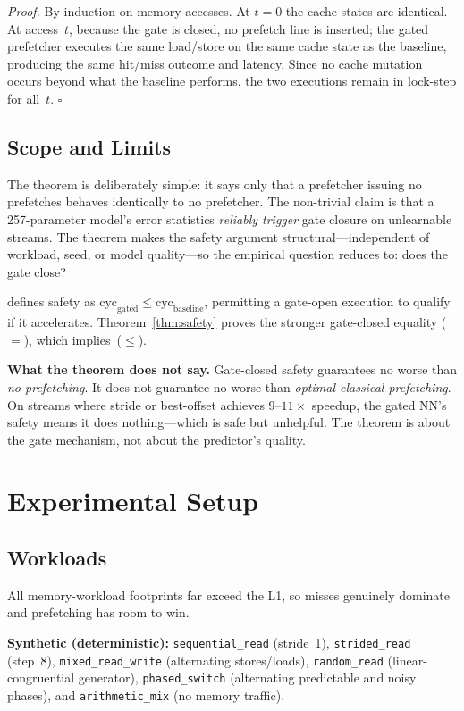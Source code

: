 \documentclass[conference]{IEEEtran}
\begin{document}
\noindent\textit{Proof.}
By induction on memory accesses. At $t{=}0$ the cache states are identical.
At access~$t$, because the gate is closed, no prefetch line is inserted; the
gated prefetcher executes the same load/store on the same cache state as the
baseline, producing the same hit/miss outcome and latency. Since no cache
mutation occurs beyond what the baseline performs, the two executions remain
in lock-step for all~$t$. \hfill$\square$

\subsection{Scope and Limits}
\label{sec:safety_limits}

The theorem is deliberately simple: it says only that a prefetcher issuing no
prefetches behaves identically to no prefetcher. The non-trivial claim is
that a 257-parameter model's error statistics \emph{reliably trigger} gate
closure on unlearnable streams. The theorem makes the safety argument
structural---independent of workload, seed, or model quality---so the
empirical question reduces to: does the gate close?

 defines safety as
$\text{cyc}_\text{gated} \leq \text{cyc}_\text{baseline}$, permitting a
gate-open execution to qualify if it accelerates.
Theorem~\ref{thm:safety} proves the stronger gate-closed equality ($=$),
which implies~($\leq$).

\textbf{What the theorem does not say.} Gate-closed safety guarantees no
worse than \emph{no prefetching}. It does not guarantee no worse than
\emph{optimal classical prefetching}. On streams where stride or best-offset
achieves $9$--$11\times$ speedup, the gated NN's safety means it does
nothing---which is safe but unhelpful. The theorem is about the gate
mechanism, not about the predictor's quality.

\section{Experimental Setup}
\label{sec:setup}

\subsection{Workloads}
\label{sec:workloads}

All memory-workload footprints far exceed the L1, so misses genuinely
dominate and prefetching has room to win.

\textbf{Synthetic (deterministic):}
\texttt{sequential\_read} (stride~1),
\texttt{strided\_read} (step~8),
\texttt{mixed\_read\_write} (alternating stores/loads),
\texttt{random\_read} (linear-congruential generator),
\texttt{phased\_switch} (alternating predictable and noisy phases), and
\texttt{arithmetic\_mix} (no memory traffic).
\end{document}
